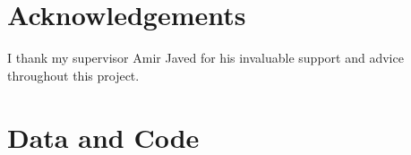 
\chapter{Acknowledgements}
I thank my supervisor Amir Javed for his invaluable support and advice throughout this project.


\chapter{Data and Code}


